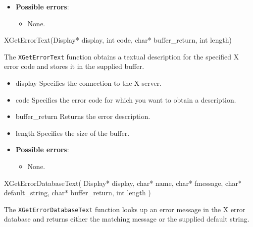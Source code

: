 \documentclass{report}
\begin{document}
\begin{itemize}
        \begin{itemize}
            \item \textbf{Possible errors}:
            \begin{itemize}
                \item None.
            \end{itemize}
        \end{itemize}

        \begin{cppcode}
            XGetErrorText(Display* display, int code, char* buffer_return, int length)
        \end{cppcode}
        \bigbreak \noindent
        The \texttt{XGetErrorText} function obtains a textual description for the specified X error code and stores it in the supplied buffer.

        \begin{itemize}
            \item display Specifies the connection to the X server.
            \item code Specifies the error code for which you want to obtain a description.
            \item buffer\_return Returns the error description.
            \item length Specifies the size of the buffer.
        \end{itemize}

        \begin{itemize}
            \item \textbf{Possible errors}:
            \begin{itemize}
                \item None.
            \end{itemize}
        \end{itemize}

        \begin{cppcode}
            XGetErrorDatabaseText(
                Display* display,
                char* name,
                char* fmessage,
                char* default_string,
                char* buffer_return,
                int length
            )
        \end{cppcode}
        \bigbreak \noindent
        The \texttt{XGetErrorDatabaseText} function looks up an error message in the X error database and returns either the matching message or the supplied default string.


\end{itemize}
\end{document}
